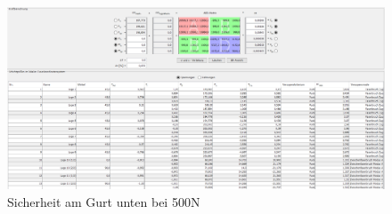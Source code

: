 \begin{figure}[h]
\centering
\includegraphics[width=1\textwidth]{Bilder/sicher4}
\caption{Sicherheit am Gurt unten bei 500N}
\label{sicher-gurt}
\end{figure}

